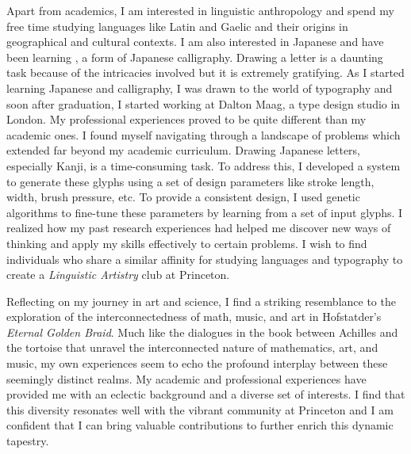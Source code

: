 \documentclass[12pt]{article}
\begin{document}
Apart from academics, I am interested in linguistic anthropology and spend my
free time studying languages like Latin and Gaelic and their origins in
geographical and cultural contexts. I am also interested in Japanese and have
been learning , a form of Japanese calligraphy. Drawing a letter is a
daunting task because of the intricacies involved but it is extremely
gratifying. As I started learning Japanese and calligraphy, I was drawn to the
world of typography and soon after graduation, I started working at Dalton Maag,
a type design studio in London. My professional experiences proved to be quite
different than my academic ones. I found myself navigating through a landscape
of problems which extended far beyond my academic curriculum. Drawing Japanese
letters, especially Kanji, is a time-consuming task. To address this, I
developed a system to generate these glyphs using a set of design parameters
like stroke length, width, brush pressure, etc. To provide a consistent design,
I used genetic algorithms to fine-tune these parameters by learning from a set
of input glyphs. I realized how my past research experiences had helped me
discover new ways of thinking and apply my skills effectively to certain
problems. I wish to find individuals who share a similar affinity for studying
languages and typography to create a \textit{Linguistic Artistry} club at Princeton.

Reflecting on my journey in art and science, I find a striking resemblance to
the exploration of the interconnectedness of math, music, and art in
Hofstatder's \textit{Eternal Golden Braid}. Much like the dialogues in the book between
Achilles and the tortoise that unravel the interconnected nature of mathematics,
art, and music, my own experiences seem to echo the profound interplay between
these seemingly distinct realms. My academic and professional experiences have
provided me with an eclectic background and a diverse set of interests. I find
that this diversity resonates well with the vibrant community at Princeton and I
am confident that I can bring valuable contributions to further enrich this
dynamic tapestry.
\end{document}
